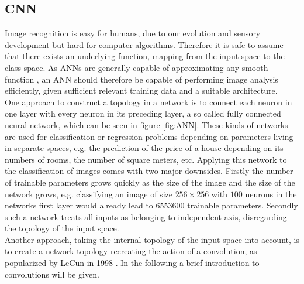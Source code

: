 \subsection{CNN}\label{sec:DiscreteConvolutions}
Image recognition is easy for humans, due to our evolution and sensory development but hard for computer algorithms. Therefore it is safe to assume that there exists an underlying function, mapping from the input space to the class space. As ANNs are generally capable of approximating any smooth function \cite{Hornik1989}, an ANN should therefore be capable of performing image analysis efficiently, given sufficient relevant training data and a suitable architecture. \\

One approach to construct a topology in a network is to connect each neuron in one layer with every neuron in its preceding layer, a so called fully connected neural network, which can be seen in figure \ref{fig:ANN}. These kinds of networks are used for classification or regression problems depending on parameters living in separate spaces, e.g. the prediction of the price of a house depending on its numbers of rooms, the number of square meters, etc. Applying this network to the classification of images comes with two major downsides. Firstly the number of trainable parameters grows quickly as the size of the image and the size of the network grows, e.g. classifying an image of size $256\times 256$ with $100$ neurons in the networks first layer would already lead to $6553600$ trainable parameters. Secondly such a network treats all inputs as belonging to independent axis, disregarding the topology of the input space. \\

Another approach, taking the internal topology of the input space into account, is to create a network topology recreating the action of a convolution, as popularized by LeCun in 1998 \cite{LeCun1998}. In the following a brief introduction to convolutions will be given.\\




